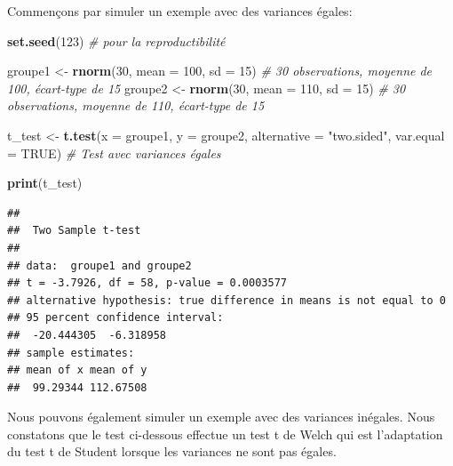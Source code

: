 \documentclass[
]{book}
\newenvironment{Shaded}{\begin{snugshade}}{\end{snugshade}}
\newcommand{\AttributeTok}[1]{\textcolor[rgb]{0.13,0.29,0.53}{#1}}
\newcommand{\CommentTok}[1]{\textcolor[rgb]{0.56,0.35,0.01}{\textit{#1}}}
\newcommand{\ConstantTok}[1]{\textcolor[rgb]{0.56,0.35,0.01}{#1}}
\newcommand{\DecValTok}[1]{\textcolor[rgb]{0.00,0.00,0.81}{#1}}
\newcommand{\FunctionTok}[1]{\textcolor[rgb]{0.13,0.29,0.53}{\textbf{#1}}}
\newcommand{\NormalTok}[1]{#1}
\newcommand{\OtherTok}[1]{\textcolor[rgb]{0.56,0.35,0.01}{#1}}
\newcommand{\StringTok}[1]{\textcolor[rgb]{0.31,0.60,0.02}{#1}}
\begin{document}
Commençons par simuler un exemple avec des variances égales:

\begin{Shaded}
\begin{Highlighting}[]
\FunctionTok{set.seed}\NormalTok{(}\DecValTok{123}\NormalTok{) }\CommentTok{\# pour la reproductibilité}

\NormalTok{groupe1 }\OtherTok{\textless{}{-}} \FunctionTok{rnorm}\NormalTok{(}\DecValTok{30}\NormalTok{, }\AttributeTok{mean =} \DecValTok{100}\NormalTok{, }\AttributeTok{sd =} \DecValTok{15}\NormalTok{)  }\CommentTok{\# 30 observations, moyenne de 100, écart{-}type de 15}
\NormalTok{groupe2 }\OtherTok{\textless{}{-}} \FunctionTok{rnorm}\NormalTok{(}\DecValTok{30}\NormalTok{, }\AttributeTok{mean =} \DecValTok{110}\NormalTok{, }\AttributeTok{sd =} \DecValTok{15}\NormalTok{)  }\CommentTok{\# 30 observations, moyenne de 110, écart{-}type de 15}

\NormalTok{t\_test }\OtherTok{\textless{}{-}} \FunctionTok{t.test}\NormalTok{(}\AttributeTok{x =}\NormalTok{ groupe1, }\AttributeTok{y =}\NormalTok{ groupe2, }\AttributeTok{alternative =} \StringTok{"two.sided"}\NormalTok{, }\AttributeTok{var.equal =} \ConstantTok{TRUE}\NormalTok{)  }\CommentTok{\# Test avec variances égales}

\FunctionTok{print}\NormalTok{(t\_test)}
\end{Highlighting}
\end{Shaded}

\begin{verbatim}
## 
##  Two Sample t-test
## 
## data:  groupe1 and groupe2
## t = -3.7926, df = 58, p-value = 0.0003577
## alternative hypothesis: true difference in means is not equal to 0
## 95 percent confidence interval:
##  -20.444305  -6.318958
## sample estimates:
## mean of x mean of y 
##  99.29344 112.67508
\end{verbatim}

Nous pouvons également simuler un exemple avec des variances inégales. Nous constatons que le test ci-dessous effectue un test t de Welch qui est l'adaptation du test t de Student lorsque les variances ne sont pas égales.
\end{document}
